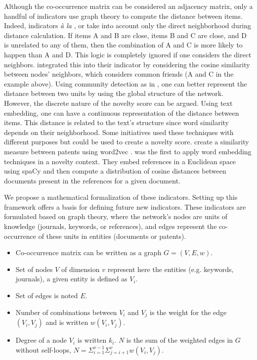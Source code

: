 Although the co-occurrence matrix can be considered an adjacency matrix, only a handful of indicators use graph theory to compute the distance between items. Indeed, indicators \textit{à la} \cite{uzzi2013atypical}, or \cite{lee2015creativity} take into account only the direct neighborhood during distance calculation. If items A and B are close, items B and C are close, and D is unrelated to any of them, then the combination of A and C is more likely to happen than A and D. This logic is completely ignored if one considers the direct neighbors. \cite{wang2017bias} integrated this into their indicator by considering the cosine similarity between nodes' neighbors, which considers common friends (A and C in the example above). Using community detection as in \cite{foster2015tradition}, one can better represent the distance between two units by using the global structure of the network. However, the discrete nature of the novelty score can be argued.
Using text embedding, one can have a continuous representation of the distance between items. This distance is related to the text's structure since word similarity depends on their neighborhood. Some initiatives used these techniques with different purposes but could be used to create a novelty score.
\cite{hain2020text} create a similarity measure between patents using word2vec \citep{mikolov2013distributed}. \cite{shibayama2021measuring} was the first to apply word embedding techniques in a novelty context. They embed references in a Euclidean space using spaCy and then compute a distribution of cosine distances between documents present in the references for a given document.



\vspace{0.5cm}

We propose a mathematical formalization of these indicators. Setting up this framework offers a basis for defining future new indicators. These indicators are formulated based on graph theory, where the network's nodes are units of knowledge (journals, keywords, or references), and edges represent the co-occurrence of these units in entities (documents or patents).

\begin{itemize}
\item Co-occurrence matrix can be written as a graph $G=(V,E,w)$. 
\item Set of nodes $V$ of dimension $v$ represent here the entities (e.g. keywords, journals), a given entity is defined as $V_i$.
\item Set of edges is noted $E$.
\item Number of combinations between $V_i$ and $V_j$ is the weight for the edge $(V_i,V_j)$ and is written $w({V_i,V_j})$.
\item Degree of a node $V_i$ is written $k_i$. $N$ is the sum of the weighted edges in $G$ without self-loops, $N=\Sigma_{i=1}^{v-1}\Sigma_{j=i+1}^{v}w(V_i,V_j)$.

\end{itemize}


